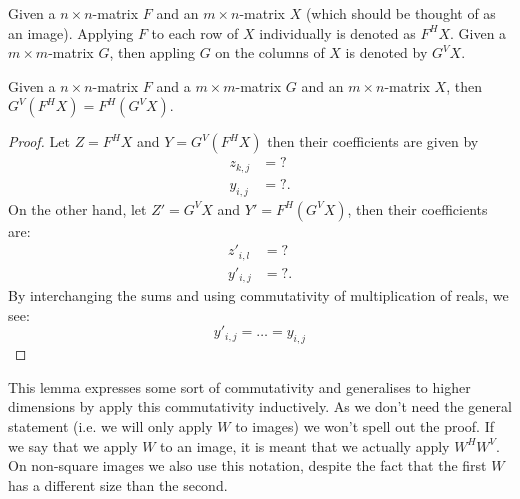 \begin{notation}
	Given a $n \times n$-matrix $F$ and an $m \times n$-matrix $X$ (which should be thought of as an image). Applying $F$ to each row of $X$ individually is denoted as $F^{H} X$.
	Given a $m \times m$-matrix $G$, then appling $G$ on the columns of $X$ is denoted by $G^{V} X$.
\end{notation}
\begin{lemma}
	Given a $n \times n$-matrix $F$ and a $m \times m$-matrix $G$ and an $m \times n$-matrix $X$, then $G^{V}(F^{H} X) = F^{H}(G^{V} X)$.
\end{lemma}
\begin{proof}
	Let $Z = F^{H} X$ and $Y = G^{V} (F^{H} X)$ then their coefficients are given by
	\begin{align}
		z_{k,j} &= ? \\
		y_{i,j} &= ?.
	\end{align}
	On the other hand, let $Z' = G^{V} X$ and $Y' = F^{H} (G^{V} X)$, then their coefficients are:
	\begin{align}
		z'_{i,l} &= ? \\
		y'_{i,j} &= ?.
	\end{align}
	By interchanging the sums and using commutativity of multiplication of reals, we see:
	\[ y'_{i,j} = \ldots = y_{i,j} \]
\end{proof}

This lemma expresses some sort of commutativity and generalises to higher dimensions by apply this commutativity inductively. As we don't need the general statement (i.e. we will only apply $W$ to images) we won't spell out the proof. If we say that we apply $W$ to an image, it is meant that we actually apply $W^{H} W^{V}$. On non-square images we also use this notation, despite the fact that the first $W$ has a different size than the second.
